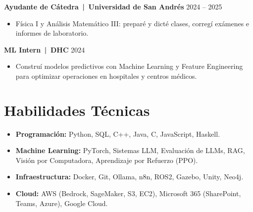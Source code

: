 \documentclass[a4paper,11pt]{article}
\begin{document}
\textbf{Ayudante de Cátedra \,|\, Universidad de San Andrés} \hfill 2024 -- 2025
\begin{itemize}
    \item Física I y Análisis Matemático III: preparé y dicté clases, corregí exámenes e informes de laboratorio.
\end{itemize}

\textbf{ML Intern \,|\, DHC} \hfill 2024
\begin{itemize}
    \item Construí modelos predictivos con Machine Learning y Feature Engineering para optimizar operaciones en hospitales y centros médicos.
\end{itemize}

\section*{Habilidades Técnicas}

\begin{itemize}
    \item \textbf{Programación:} Python, SQL, C++, Java, C, JavaScript, Haskell.
    \item \textbf{Machine Learning:} PyTorch, Sistemas LLM, Evaluación de LLMs, RAG, Visión por Computadora, Aprendizaje por Refuerzo (PPO).
    \item \textbf{Infraestructura:} Docker, Git, Ollama, n8n, ROS2, Gazebo, Unity, Neo4j.
    \item \textbf{Cloud:} AWS (Bedrock, SageMaker, S3, EC2), Microsoft 365 (SharePoint, Teams, Azure), Google Cloud.
\end{itemize}
\end{document}
